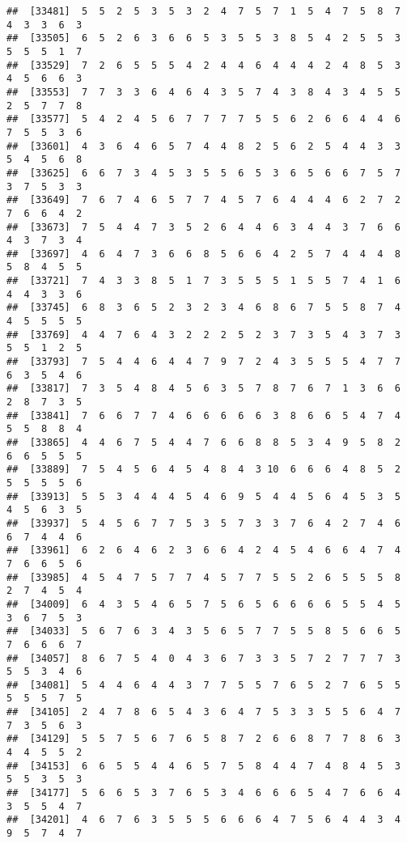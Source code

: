 \documentclass[
]{book}
\begin{document}
\begin{verbatim}
##  [33481]  5  5  2  5  3  5  3  2  4  7  5  7  1  5  4  7  5  8  7  4  3  3  6  3
##  [33505]  6  5  2  6  3  6  6  5  3  5  5  3  8  5  4  2  5  5  3  5  5  5  1  7
##  [33529]  7  2  6  5  5  5  4  2  4  4  6  4  4  4  2  4  8  5  3  4  5  6  6  3
##  [33553]  7  7  3  3  6  4  6  4  3  5  7  4  3  8  4  3  4  5  5  2  5  7  7  8
##  [33577]  5  4  2  4  5  6  7  7  7  7  5  5  6  2  6  6  4  4  6  7  5  5  3  6
##  [33601]  4  3  6  4  6  5  7  4  4  8  2  5  6  2  5  4  4  3  3  5  4  5  6  8
##  [33625]  6  6  7  3  4  5  3  5  5  6  5  3  6  5  6  6  7  5  7  3  7  5  3  3
##  [33649]  7  6  7  4  6  5  7  7  4  5  7  6  4  4  4  6  2  7  2  7  6  6  4  2
##  [33673]  7  5  4  4  7  3  5  2  6  4  4  6  3  4  4  3  7  6  6  4  3  7  3  4
##  [33697]  4  6  4  7  3  6  6  8  5  6  6  4  2  5  7  4  4  4  8  5  8  4  5  5
##  [33721]  7  4  3  3  8  5  1  7  3  5  5  5  1  5  5  7  4  1  6  4  4  3  3  6
##  [33745]  6  8  3  6  5  2  3  2  3  4  6  8  6  7  5  5  8  7  4  4  5  5  5  5
##  [33769]  4  4  7  6  4  3  2  2  2  5  2  3  7  3  5  4  3  7  3  5  5  1  2  5
##  [33793]  7  5  4  4  6  4  4  7  9  7  2  4  3  5  5  5  4  7  7  6  3  5  4  6
##  [33817]  7  3  5  4  8  4  5  6  3  5  7  8  7  6  7  1  3  6  6  2  8  7  3  5
##  [33841]  7  6  6  7  7  4  6  6  6  6  6  3  8  6  6  5  4  7  4  5  5  8  8  4
##  [33865]  4  4  6  7  5  4  4  7  6  6  8  8  5  3  4  9  5  8  2  6  6  5  5  5
##  [33889]  7  5  4  5  6  4  5  4  8  4  3 10  6  6  6  4  8  5  2  5  5  5  5  6
##  [33913]  5  5  3  4  4  4  5  4  6  9  5  4  4  5  6  4  5  3  5  4  5  6  3  5
##  [33937]  5  4  5  6  7  7  5  3  5  7  3  3  7  6  4  2  7  4  6  6  7  4  4  6
##  [33961]  6  2  6  4  6  2  3  6  6  4  2  4  5  4  6  6  4  7  4  7  6  6  5  6
##  [33985]  4  5  4  7  5  7  7  4  5  7  7  5  5  2  6  5  5  5  8  2  7  4  5  4
##  [34009]  6  4  3  5  4  6  5  7  5  6  5  6  6  6  6  5  5  4  5  3  6  7  5  3
##  [34033]  5  6  7  6  3  4  3  5  6  5  7  7  5  5  8  5  6  6  5  7  6  6  6  7
##  [34057]  8  6  7  5  4  0  4  3  6  7  3  3  5  7  2  7  7  7  3  5  5  3  4  6
##  [34081]  5  4  4  6  4  4  3  7  7  5  5  7  6  5  2  7  6  5  5  5  5  5  7  5
##  [34105]  2  4  7  8  6  5  4  3  6  4  7  5  3  3  5  5  6  4  7  7  3  5  6  3
##  [34129]  5  5  7  5  6  7  6  5  8  7  2  6  6  8  7  7  8  6  3  4  4  5  5  2
##  [34153]  6  6  5  5  4  4  6  5  7  5  8  4  4  7  4  8  4  5  3  5  5  3  5  3
##  [34177]  5  6  6  5  3  7  6  5  3  4  6  6  6  5  4  7  6  6  4  3  5  5  4  7
##  [34201]  4  6  7  6  3  5  5  5  6  6  6  4  7  5  6  4  4  3  4  9  5  7  4  7

\end{verbatim}
\end{document}
